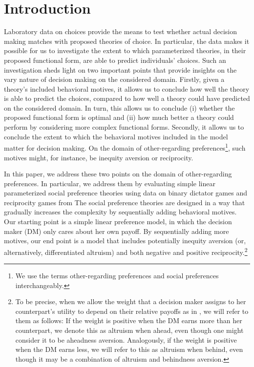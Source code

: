 \documentclass[11pt,a4paper]{article}
\theoremstyle{definition}
\begin{document}
\section{Introduction}
\label{sec:introduction}
Laboratory data on choices provide the means to test whether actual decision making matches with proposed theories of choice. In particular, the data makes it possible for us to investigate the extent to which parameterized theories, in their proposed functional form, are able to predict individuals' choices. Such an investigation sheds light on two important points that provide insights on the vary nature of decision making on the considered domain. Firstly, given a theory's included behavioral motives, it allows us to conclude how well the theory is able to predict the choices, compared to how well a theory could have predicted on the considered domain. In turn, this allows us to conclude (i) whether the proposed functional form is optimal and (ii) how much better a theory could perform by considering more complex functional forms. Secondly, it allows us to conclude the extent to which the behavioral motives included in the model matter for decision making. On the domain of other-regarding preferences\footnote{We use the terms other-regarding preferences and social preferences interchangeably.}, such motives might, for instance, be inequity aversion or reciprocity.

In this paper, we address these two points on the domain of other-regarding preferences. In particular, we address them by evaluating simple linear parameterized social preference theories using data on binary dictator games and reciprocity games from \cite{Bruhin2019} The social preference theories are designed in a way that gradually increases the complexity by sequentially adding behavioral motives. Our starting point is a simple linear preference model, in which the decision maker (DM) only cares about her own payoff. By sequentially adding more motives, our end point is a model that includes potentially inequity aversion (or, alternatively, differentiated altruism) and both negative and positive reciprocity.\footnote{To be precise, when we allow the weight that a decision maker assigns to her counterpart's utility to depend on their relative payoffs as in \cite{Fehr1999}, we will refer to them as follows: If the weight is positive when the DM earns more than her counterpart, we denote this as altruism when ahead, even though one might consider it to be aheadness aversion. Analogously, if the weight is positive when the DM earns less, we will refer to this as altruism when behind, even though it may be a combination of altruism and behindness aversion.}
\end{document}

